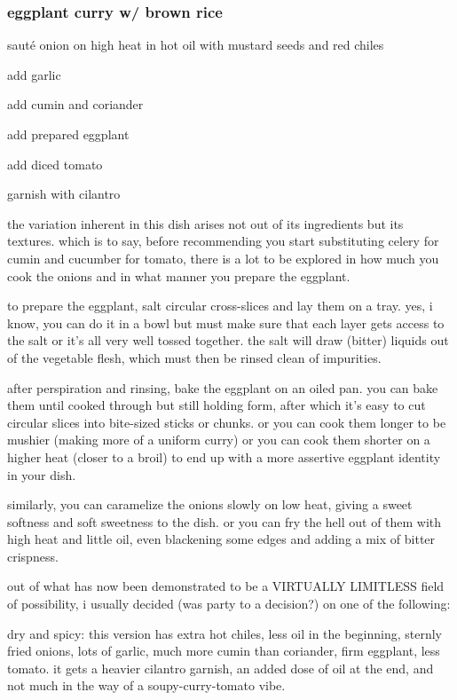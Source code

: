 \subsubsection{eggplant curry w/ brown rice}

\begin{algorithm}
  \item saut\'{e} onion on high heat in hot oil with mustard seeds and red chiles
  \item add garlic
  \item add cumin and coriander
  \item add prepared eggplant
  \item add diced tomato
  \item garnish with cilantro
\end{algorithm}

the variation inherent in this dish arises not out of its ingredients but its 
textures. which is to say, before recommending you start substituting celery 
for cumin and cucumber for tomato, there is a lot to be explored in how much 
you cook the onions and in what manner you prepare the eggplant.

to prepare the eggplant, salt circular cross-slices and lay them on a tray. 
yes, i know, you can do it in a bowl but must make sure that each layer gets 
access to the salt or it's all very well tossed together. the salt will draw 
(bitter) liquids out of the vegetable flesh, which must then be rinsed clean of 
impurities.

after perspiration and rinsing, bake the eggplant on an oiled pan. you can bake 
them until cooked through but still holding form, after which it's easy to cut 
circular slices into bite-sized sticks or chunks. or you can cook them longer 
to be mushier (making more of a uniform curry) or you can cook them shorter on 
a higher heat (closer to a broil) to end up with a more assertive eggplant 
identity in your dish.

similarly, you can caramelize the onions slowly on low heat, giving a sweet 
softness and soft sweetness to the dish. or you can fry the hell out of them 
with high heat and little oil, even blackening some edges and adding a mix of 
bitter crispness.

out of what has now been demonstrated to be a VIRTUALLY LIMITLESS field of 
possibility, i usually decided (was party to a decision?) on one of the 
following:

dry and spicy: this version has extra hot chiles, less oil in the beginning, 
sternly fried onions, lots of garlic, much more cumin than coriander, firm 
eggplant, less tomato. it gets a heavier cilantro garnish, an added dose of oil 
at the end, and not much in the way of a soupy-curry-tomato vibe.

